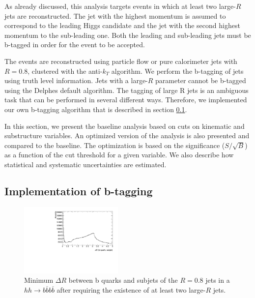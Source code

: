 As already discussed, this analysis targets events in which at least two large-$R$ jets are reconstructed. The jet with the highest momentum is assumed to correspond to the leading Higgs candidate and the jet with the second highest momentum to the sub-leading one. Both the leading and sub-leading jets must be b-tagged in order for the event to be accepted.

The events are reconstructed using particle flow or pure calorimeter jets with $R=0.8$, clustered with the anti-$k_T$ algorithm. We perform the b-tagging of jets using truth level information. Jets with a large-$R$ parameter cannot be b-tagged using the Delphes default algorithm. The tagging of large R jets is an ambiguous task that can be performed in several different ways. Therefore, we implemented our own b-tagging algorithm that is described in section \ref{sec:btagging}. 

In this section, we present the baseline analysis based on cuts on kinematic and substructure variables. An optimized version of the analysis is also presented and compared to the baseline. The optimization is based on the significance ($S/\sqrt{B}$) as a function of the cut threshold for a given variable. We also describe how statistical and systematic uncertainties are estimated. 

\subsection{Implementation of b-tagging}
\label{sec:btagging}


\begin{figure}
	\centering
	\includegraphics[width=0.45\textwidth]{./Figures/deltaR_bsubjet}
	\caption{\label{fig:deltaR_bsubjet}Minimum $\Delta R$ between b quarks and subjets of the $R=0.8$ jets in a $hh\rightarrow b\overline{b}b\overline{b}$ after requiring the existence of at least two large-$R$ jets.}
\end{figure}

